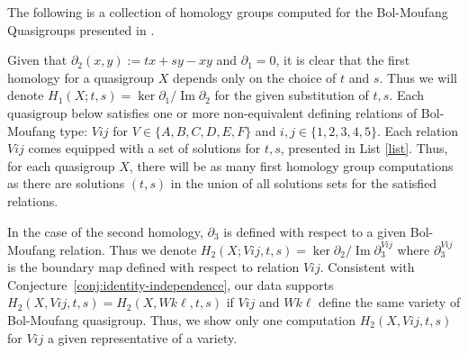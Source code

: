 \documentclass[11pt]{amsart}
\theoremstyle{definition}
\begin{document}
The following is a collection of homology groups computed for the Bol-Moufang Quasigroups presented in \cite{PhVo1, PhVo2}. 

Given that $\partial_2(x,y) := t x + sy - xy$ and $\partial_1 = 0$, it is clear that the first homology for a quasigroup $X$ depends only on the choice of $t$ and $s$. Thus we will denote $H_1(X;t,s) = \ker \partial_1/\operatorname{Im}\partial_2$ for the given substitution of $t,s$. Each quasigroup below satisfies one or more non-equivalent  defining relations of Bol-Moufang type:  $Vij$ for $V \in \{A,B,C,D,E,F\}$ and $i,j \in \{1,2,3,4,5\}$. Each relation $Vij$ comes equipped with a set of solutions for $t,s$, presented in List  \ref{list}. Thus, for each quasigroup $X$, there will be as many first homology group computations as there are solutions $(t,s)$ in the union of all solutions sets for the satisfied relations.

In the case of the second homology, $\partial_3$ is defined with respect to a given Bol-Moufang relation. Thus we denote $H_2(X;Vij,t,s) = \ker \partial_2/\operatorname{Im}\partial_3^{Vij}$ where $\partial_3^{Vij}$ is the boundary map defined with respect to relation $Vij.$ Consistent with Conjecture~\ref{conj:identity-independence}, our data supports  $H_2(X,Vij,t,s) = H_2(X,Wk\ell,t,s)$ if $Vij$ and $Wk\ell$  define the same variety of Bol-Moufang quasigroup. Thus, we show only one computation $H_2(X,Vij,t,s)$ for $Vij$ a given representative of a variety.
\end{document}
